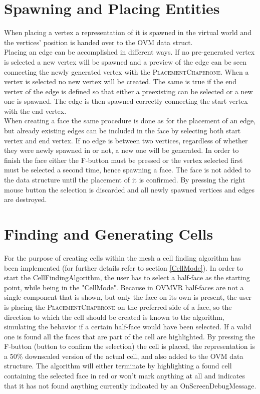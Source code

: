 \documentclass{report}
\begin{document}
	\section{Spawning and Placing Entities}
	\startsection
		When placing a vertex a representation of it is spawned in the virtual world and the vertices' position is handed over to the OVM data struct. \\
		Placing an edge can be accomplished in different ways. If no pre-generated vertex is selected a new vertex will be spawned and a preview of the edge can be seen connecting the newly generated vertex with the \textsc{PlacementChaperone}. When a vertex is selected no new vertex will be created. The same is true if the end vertex of the edge is defined so that either a preexisting can be selected or a new one is spawned. The edge is then spawned correctly connecting the start vertex with the end vertex. \\
		When creating a face the same procedure is done as for the placement of an edge, but already existing edges can be included in the face by selecting both start vertex and end vertex. If no edge is between two vertices, regardless of whether they were newly spawned in or not, a new one will be generated. In order to finish the face either the F-button must be pressed or the vertex selected first must be selected a second time, hence spawning a face. The face is not added to the data structure until the placement of it is confirmed. By pressing the right mouse button the selection is discarded and all newly spawned vertices and edges are destroyed.
	\closesection
	
	\section{Finding and Generating Cells}
	\startsection
		For the purpose of creating cells within the mesh a cell finding algorithm has been implemented (for further details refer to section \ref{CellMode}). In order to start the CellFindingAlgorithm, the user has to select a half-face as the starting point, while being in the "CellMode". Because in OVMVR half-faces are not a single component that is shown, but only the face on its own is present, the user is placing the \textsc{PlacementChaperone} on the preferred side of a face, so the direction to which the cell should be created is known to the algorithm, simulating the behavior if a certain half-face would have been selected. If a valid one is found all the faces that are part of the cell are highlighted. By pressing the F-button (button to confirm the selection) the cell is placed, the representation is a 50\% downscaled version of the actual cell, and also added to the OVM data structure. The algorithm will either terminate by highlighting a found cell containing the selected face in red or won't mark anything at all and indicates that it has not found anything currently indicated by an OnScreenDebugMessage.
	\closesection
	
\end{document}
